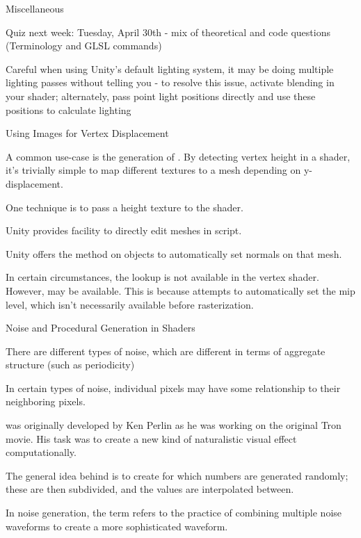 \documentclass[11pt]{article}
\begin{document}
\maketitle

\begin{topic}{Miscellaneous}
	\item Quiz next week: Tuesday, April 30th - mix of theoretical and code questions (Terminology and GLSL commands)
	\item Careful when using Unity's default lighting system, it may be doing multiple lighting passes without telling you - to resolve this issue, activate blending in your shader; alternately, pass point light positions directly and use these positions to calculate lighting
\end{topic}

\begin{topic}{Using Images for Vertex Displacement}
	\item A common use-case is the generation of . By detecting vertex height in a shader, it's trivially simple to map different textures to a mesh depending on y-displacement.
	\item One technique is to pass a height texture to the shader.
	\item Unity provides facility to directly edit meshes in script.
	\item Unity offers the  method on  objects to automatically set normals on that mesh.
	\item In certain circumstances, the  lookup is not available in the vertex shader. However,  may be available. This is because  attempts to automatically set the mip level, which isn't necessarily available before rasterization.
\end{topic}

\begin{topic}{Noise and Procedural Generation in Shaders}
	\item There are different types of noise, which are different in terms of aggregate structure (such as periodicity)
	\item In certain types of noise, individual pixels may have some relationship to their neighboring pixels.
	\item {} was originally developed by Ken Perlin as he was working on the original Tron movie. His task was to create a new kind of naturalistic visual effect computationally.
	\item The general idea behind  is to create  for which numbers are generated randomly; these  are then subdivided, and the values are interpolated between.
	\item In noise generation, the term  refers to the practice of combining multiple noise waveforms to create a more sophisticated waveform. 
\end{topic}
\end{document}
